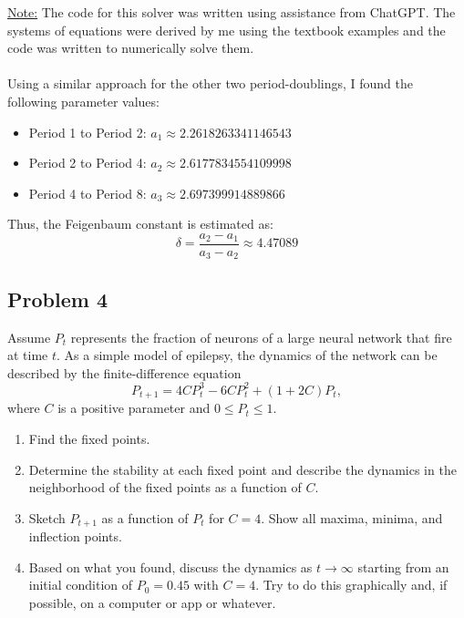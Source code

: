 \documentclass[11pt]{article}
\begin{document}
\underline{Note:} The code for this solver was written using assistance from ChatGPT. The systems of equations were derived by me using the textbook examples and the code was written to numerically solve them.\\\\
Using a similar approach for the other two period-doublings, I found the following parameter values:
\begin{itemize}
    \item Period 1 to Period 2: $a_1 \approx 2.2618263341146543$
    \item Period 2 to Period 4: $a_2 \approx 2.6177834554109998$
    \item Period 4 to Period 8: $a_3 \approx 2.697399914889866$
\end{itemize}
Thus, the Feigenbaum constant is estimated as:
\[\delta = \frac{a_2 - a_1}{a_3 - a_2} \approx \boxed{4.47089}\]



\subsection*{Problem 4}
Assume $P_t$ represents the fraction of neurons of a large neural network that fire at time $t$. As a simple model of epilepsy, the dynamics of the network can be described by the finite-difference equation
\[
P_{t+1} = 4CP_t^3 - 6CP_t^2 + (1 + 2C)P_t,
\]
where $C$ is a positive parameter and $0 \le P_t \le 1$.

\begin{enumerate}
    \item[(a)] Find the fixed points.
    \item[(b)] Determine the stability at each fixed point and describe the dynamics in the neighborhood of the fixed points as a function of $C$.
    \item[(c)] Sketch $P_{t+1}$ as a function of $P_t$ for $C = 4$. Show all maxima, minima, and inflection points.
    \item[(d)] Based on what you found, discuss the dynamics as $t \to \infty$ starting from an initial condition of $P_0 = 0.45$ with $C = 4$. Try to do this graphically and, if possible, on a computer or app or whatever.
\end{enumerate}
\end{document}
